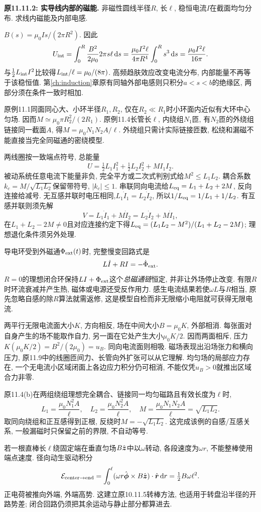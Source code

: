 \begin{example}
\textbf{原11.11.2: 实导线内部的磁能.} 
非磁性圆线半径$R$, 长$\ell$, 稳恒电流$I$在截面均匀分布. 求线内磁能及内部电感.
\end{example}
\begin{solution}
$B(s)=\mu_0Is/(2\pi R^2)$. 因此
\[U_{\rm int}=\int_0^R\frac{B^2}{2\mu_0}2\pi s\ell\,\mathrm d s
=\frac{\mu_0I^2\ell}{4\pi R^4}\int_0^Rs^3\,\mathrm d s=\frac{\mu_0I^2\ell}{16\pi}.\]
与$\tfrac12L_{\rm int}I^2$比较得$L_{\rm int}/\ell=\mu_0/(8\pi)$. 高频趋肤效应改变电流分布, 内部能量不再等于该稳恒值. 第\ref{ch:induction}章原有同轴外部电感则只积分$a<s<b$的绝缘区, 两部分须在条件一致时相加.
\end{solution}

\label{tb:coupled-l}
原例11.1同面同心大、小环半径$R_1,R_2$, 仅在$R_2\ll R_1$时小环面内近似有大环中心匀场. 因而$M\simeq\mu_0\pi R_2^2/(2R_1)$. 原例11.4长管长$\ell$, 内绕组$N_1$匝, 有$N_2$匝的外绕组链接同一截面$A$, 得$M=\mu_0N_1N_2A/\ell$. 外绕组只需计实际链接匝数, 松绕和漏磁不能直接当完全同磁通的密绕模型.

两线圈按一致端点符号, 总能量
\[U=\tfrac12L_1I_1^2+\tfrac12L_2I_2^2+MI_1I_2.\]
被动系统任意电流下能量非负, 完全平方或二次式判别式给$M^2\le L_1L_2$. 耦合系数$k_c=M/\sqrt{L_1L_2}$保留带符号, $|k_c|\le1$. 串联同向电流给$L_{\rm eq}=L_1+L_2+2M$, 反向连接给减号. 无互感并联时电压相同,$L_1\dot I_1=L_2\dot I_2$, 所以$1/L_{\rm eq}=1/L_1+1/L_2$. 有互感并联则须先解
\[V=L_1\dot I_1+M\dot I_2=L_2\dot I_2+M\dot I_1,\]
在$L_1+L_2-2M\ne0$且对应连接约定下得$L_{\rm eq}=(L_1L_2-M^2)/(L_1+L_2-2M)$; 理想退化条件须另外处理.

导电环受到外磁通$\Phi_{\rm ext}(t)$时, 完整慢变回路式是
\[L\dot I+RI=-\dot\Phi_{\rm ext}.\]
$R=0$的理想闭合环保持$LI+\Phi_{\rm ext}$这个\emph{总磁通链}恒定, 并非让外场停止改变. 有限$R$时环流衰减并产生热, 磁体或电源还受反作用力. 感生电流结果若使$\omega L$与$R$相当, 原先忽略自感的除$R$算法就需返修, 这是模型自检而非无限缩小电阻就可获得无限电流.

\label{tb:magnetic-pressure}
两平行无限电流面大小$K$, 方向相反, 场在中间大小$B=\mu_0K$, 外部相消. 每张面对自身产生的场不能取作自力, 另一面在它处产生大小$\mu_0K/2$. 因而两面相斥, 压力$K(\mu_0K/2)=B^2/(2\mu_0)=u_B$. 同向电流面则相吸. 磁场表现出沿场张力和横向压力, 原11.9中的线圈匝间力、长管向外扩张可以从它理解. 均匀场的局部应力存在, 一个无电流小区域闭面上各边应力积分仍可相消, 不能仅凭$u_B>0$就推出区域合力非零.

原11.4(b)在两组绕组理想完全耦合、链接同一均匀磁路且有效长度为$\ell$时,
\[L_1=\frac{\mu_0N_1^2A}{\ell},\quad L_2=\frac{\mu_0N_2^2A}{\ell},\quad
M=\frac{\mu_0N_1N_2A}{\ell}=\sqrt{L_1L_2}.\]
取同向绕组和正互感得到正根, 反绕时$M=-\sqrt{L_1L_2}$. 这完成该例的自感/互感关系, 一般漏磁时只保留之前的界限, 不自动等号.

若一根直棒长$\ell$绕固定端在垂直匀场$B\hat{\boldsymbol{z}}$中以$\omega$转动, 各段速度为$\omega r$, 不能整棒使用端点速度. 径向动生驱动积分
\[\mathcal E_{\rm center\to end}=\int_0^\ell(\omega r\hat{\boldsymbol{\phi}}\times B\hat{\boldsymbol{z}})\cdot\hat{\boldsymbol{r}}\,\mathrm d r=\tfrac12B\omega\ell^2.\]
正电荷被推向外端, 外端高势. 这建立原10.11.5转棒方法, 也适用于转盘沿半径的开路势差; 闭合回路仍须把其余运动与静止部分都算进去.
